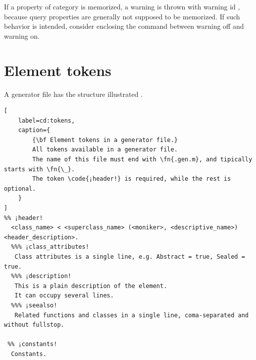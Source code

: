 \documentclass{tufte-handout}
\begin{document}
If a property of category  is memorized, a warning is thrown with warning id , because query properties are generally not supposed to be memorized. If such behavior is intended, consider enclosing the command between warning off and warning on.

\section{Element tokens}

A generator file has the structure illustrated .
%
\begin{fullwidth}
\begin{lstlisting}[
	label=cd:tokens,
	caption={
		{\bf Element tokens in a generator file.}
		All tokens available in a generator file.
		The name of this file must end with \fn{.gen.m}, and tipically starts with \fn{\_}.
		The token \code{¡header!} is required, while the rest is optional.
	}
]
%% ¡header!
  <class_name> < <superclass_name> (<moniker>, <descriptive_name>) <header_description>.
  %%% ¡class_attributes!
   Class attributes is a single line, e.g. Abstract = true, Sealed = true.
  %%% ¡description!
   This is a plain description of the element.
   It can occupy several lines.
  %%% ¡seealso!
   Related functions and classes in a single line, coma-separated and without fullstop.
  
 %% ¡constants!
  Constants.
 

\end{lstlisting}
\end{fullwidth}
\end{document}

